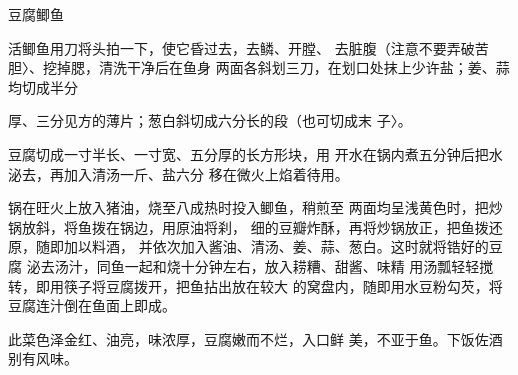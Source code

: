 \begin{recipe}{豆腐鲫鱼}

\ingredients



\cooking

\step 活鲫鱼用刀将头拍一下，使它昏过去，去鳞、开膛、 去脏腹（注意不要弄破苦胆〉、挖掉腮，清洗干净后在鱼身 两面各斜划三刀，在划口处抹上少许盐；姜、蒜均切成半分

厚、三分见方的薄片；葱白斜切成六分长的段（也可切成末 子〉。

\step 豆腐切成一寸半长、一寸宽、五分厚的长方形块，用 开水在锅内煮五分钟后把水泌去，再加入清汤一斤、盐六分 移在微火上焰着待用。

锅在旺火上放入猪油，烧至八成热时投入鲫鱼，稍煎至 两面均呈浅黄色时，把炒锅放斜，将鱼拨在锅边，用原油将刹， 细的豆瓣炸酥，再将炒锅放正，把鱼拨还原，随即加以料酒， 并依次加入酱油、清汤、姜、蒜、葱白。这时就将锆好的豆腐 泌去汤汁，同鱼一起和烧十分钟左右，放入耢糟、甜酱、味精 用汤瓢轻轻搅转，即用筷子将豆腐拨开，把鱼拈出放在较大 的窝盘内，随即用水豆粉勾芡，将豆腐连汁倒在鱼面上即成。

\notes

此菜色泽金红、油亮，味浓厚，豆腐嫩而不烂，入口鲜 美，不亚于鱼。下饭佐酒别有风味。

\end{recipe}

